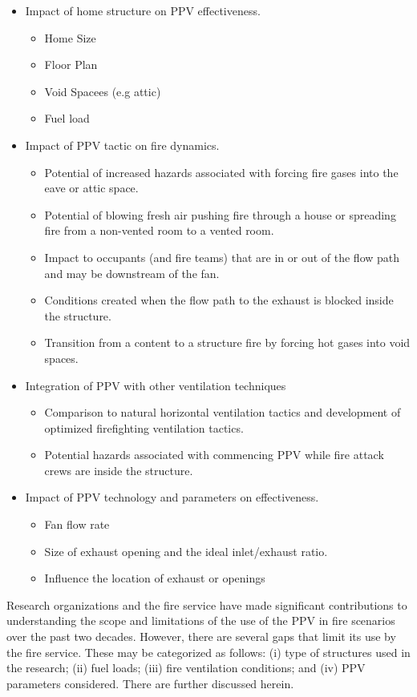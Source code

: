 \documentclass{article}
\begin{document}
\begin{itemize}
	\item Impact of home structure on PPV effectiveness.
	\begin{itemize}
		\item Home Size
		\item Floor Plan
		\item Void Spacees (e.g attic)
		\item Fuel load
	\end{itemize}
	\item Impact of PPV tactic on fire dynamics.
	\begin{itemize}
		\item Potential of increased hazards associated with forcing fire gases into the eave or attic space.
		\item Potential of blowing fresh air pushing fire through a house or spreading fire from a non-vented room to a vented room.
		\item Impact to occupants (and fire teams) that are in or out of the flow path and may be downstream of the fan.
		\item Conditions created when the flow path to the exhaust is blocked inside the structure.
		\item Transition from a content to a structure fire by forcing hot gases into void spaces.
	\end{itemize}
	\item Integration of PPV with other ventilation techniques
	\begin{itemize}
		\item Comparison to natural horizontal ventilation tactics and development of optimized firefighting ventilation tactics.
		\item Potential hazards associated with commencing PPV while fire attack crews are inside the structure.
	\end{itemize}
	\item Impact of PPV technology and parameters on effectiveness.
	\begin{itemize}
		\item Fan flow rate
		\item Size of exhaust opening and the ideal inlet/exhaust ratio.
		\item Influence the location of exhaust or openings
	\end{itemize}
\end{itemize}

Research organizations and the fire service have made significant contributions to understanding the scope and limitations of the use of the PPV in fire scenarios over the past two decades. However, there are several gaps that limit its use by the fire service. These may be categorized as follows: (i) type of structures used in the research; (ii) fuel loads; (iii) fire ventilation conditions; and (iv) PPV parameters considered. There are further discussed herein. \par
\end{document}
